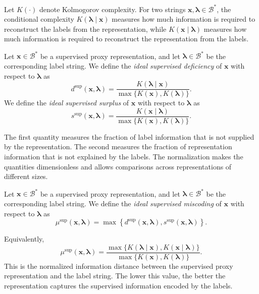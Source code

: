 Let \(K(\cdot)\) denote Kolmogorov complexity. For two strings \(\mathbf{x},\boldsymbol{\lambda}\in\mathcal B^\ast\), the conditional complexity \(K(\boldsymbol{\lambda}\mid \mathbf{x})\) measures how much information is required to reconstruct the labels from the representation, while \(K(\mathbf{x}\mid \boldsymbol{\lambda})\) measures how much information is required to reconstruct the representation from the labels.

\begin{definition}
\label{def:ideal_supervised_deficiency_surplus}
Let \(\mathbf{x}\in\mathcal B^\ast\) be a supervised proxy representation, and let \(\boldsymbol{\lambda}\in\mathcal B^\ast\) be the corresponding label string. We define the \emph{ideal supervised deficiency} of \(\mathbf{x}\) with respect to \(\boldsymbol{\lambda}\) as
\[
    d^{\mathrm{sup}}(\mathbf{x},\boldsymbol{\lambda})
    =
    \frac{K(\boldsymbol{\lambda}\mid \mathbf{x})}
    {\max\{K(\mathbf{x}),K(\boldsymbol{\lambda})\}}.
\]
We define the \emph{ideal supervised surplus} of \(\mathbf{x}\) with respect to \(\boldsymbol{\lambda}\) as
\[
    s^{\mathrm{sup}}(\mathbf{x},\boldsymbol{\lambda})
    =
    \frac{K(\mathbf{x}\mid \boldsymbol{\lambda})}
    {\max\{K(\mathbf{x}),K(\boldsymbol{\lambda})\}}.
\]
\end{definition}

The first quantity measures the fraction of label information that is not supplied by the representation. The second measures the fraction of representation information that is not explained by the labels. The normalization makes the quantities dimensionless and allows comparisons across representations of different sizes.

\begin{definition}
\label{def:ideal_supervised_miscoding}
Let \(\mathbf{x}\in\mathcal B^\ast\) be a supervised proxy representation, and let \(\boldsymbol{\lambda}\in\mathcal B^\ast\) be the corresponding label string. We define the \emph{ideal supervised miscoding} of \(\mathbf{x}\) with respect to \(\boldsymbol{\lambda}\) as
\[
    \mu^{\mathrm{sup}}(\mathbf{x},\boldsymbol{\lambda})
    =
    \max\left\{
        d^{\mathrm{sup}}(\mathbf{x},\boldsymbol{\lambda}),
        s^{\mathrm{sup}}(\mathbf{x},\boldsymbol{\lambda})
    \right\}.
\]
\end{definition}

Equivalently,
\[
    \mu^{\mathrm{sup}}(\mathbf{x},\boldsymbol{\lambda})
    =
    \frac{
        \max\{K(\boldsymbol{\lambda}\mid \mathbf{x}),
              K(\mathbf{x}\mid \boldsymbol{\lambda})\}
    }
    {\max\{K(\mathbf{x}),K(\boldsymbol{\lambda})\}}.
\]
This is the normalized information distance between the supervised proxy representation and the label string. The lower this value, the better the representation captures the supervised information encoded by the labels.

